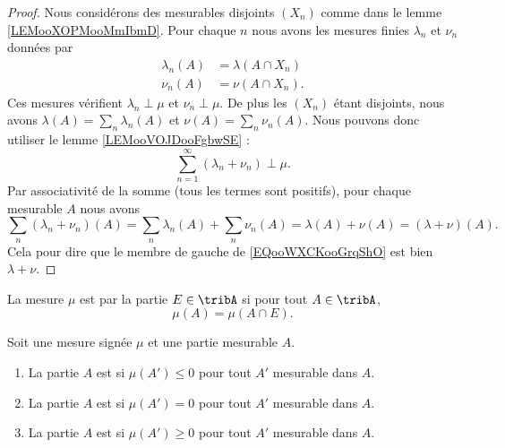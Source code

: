 \begin{proof}
	Nous considérons des mesurables disjoints \( (X_n)\) comme dans le lemme \ref{LEMooXOPMooMmIbmD}. Pour chaque \( n\) nous avons les mesures finies \( \lambda_n\) et \( \nu_n\) données par
	\begin{subequations}
		\begin{align}
			\lambda_n(A) & =\lambda(A\cap X_n) \\
			\nu_n(A)     & =\nu(A\cap X_n).
		\end{align}
	\end{subequations}
	Ces mesures vérifient \( \lambda_n\perp \mu\) et \( \nu_n\perp \mu\). De plus les \( (X_n)\) étant disjoints, nous avons \( \lambda(A)=\sum_n\lambda_n(A)\) et \( \nu(A)=\sum_n\nu_n(A)\). Nous pouvons donc utiliser le lemme \ref{LEMooVOJDooFgbwSE} :
	\begin{equation}		\label{EQooWXCKooGrqShO}
		\sum_{n=1}^{\infty}(\lambda_n+\nu_n)\perp\mu.
	\end{equation}
	Par associativité de la somme (tous les termes sont positifs), pour chaque mesurable \( A\) nous avons
	\begin{equation}
		\sum_n(\lambda_n+\nu_n)(A)=\sum_n\lambda_n(A)+\sum_n\nu_n(A)=\lambda(A)+\nu(A)=(\lambda+\nu)(A).
	\end{equation}
	Cela pour dire que le membre de gauche de \eqref{EQooWXCKooGrqShO} est bien \( \lambda+\nu\).
\end{proof}


\begin{definition}
	La mesure \( \mu\) est  par la partie \( E\in\tribA\) si pour tout \( A\in\tribA\),
	\begin{equation}
		\mu(A)=\mu(A\cap E).
	\end{equation}
\end{definition}

\begin{definition}
	Soit une mesure signée \( \mu\) et une partie mesurable \( A\).
	\begin{enumerate}
		\item
		      La partie \( A\) est  si \( \mu(A')\leq 0\) pour tout \( A'\) mesurable dans \( A\).
		\item
		      La partie \( A\) est  si \( \mu(A')= 0\) pour tout \( A'\) mesurable dans \( A\).
		\item
		      La partie \( A\) est  si \( \mu(A')\geq0\) pour tout \( A'\) mesurable dans \( A\).
	\end{enumerate}
\end{definition}


